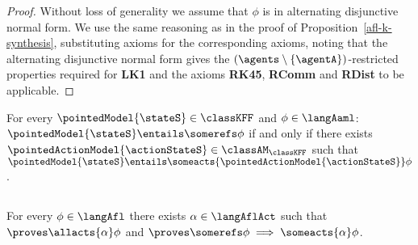 \documentclass[twoside]{aiml14}
\begin{document}
  \begin{proof}
      Without loss of generality we assume that $\phi$ is in alternating
      disjunctive normal form. We use the same reasoning as in the proof of
      Proposition~\ref{afl-k-synthesis}, substituting \axiomAflKFF{} axioms for
      the corresponding \axiomAflK{} axioms, noting that the alternating
      disjunctive normal form gives the $(\agents \setminus
      \{\agentA\})$-restricted properties required for {\bf LK1} and the
      \axiomRmlKFF{} axioms {\bf RK45}, {\bf RComm} and  {\bf RDist} to be
      applicable.
  \end{proof}

  \begin{corollary}
      For every $\pointedModel{\stateS} \in \classKFF$ and $\phi \in \langAaml$: 
      $\pointedModel{\stateS} \entails \somerefs \phi$ if and only if 
      there exists $\pointedActionModel{\actionStateS} \in \classAM_\classKFF$ 
      such that $\pointedModel{\stateS} \entails \someacts{\pointedActionModel{\actionStateS}} \phi$.
  \end{corollary}

  \subsection{\classS{}}

  \begin{proposition}\label{afl-s-synthesis}
      For every $\phi \in \langAfl$ there exists $\alpha \in \langAflAct$ such that $\proves \allacts{\alpha} \phi$ and $\proves \somerefs \phi \implies \someacts{\alpha} \phi$.
  \end{proposition}
\end{document}

